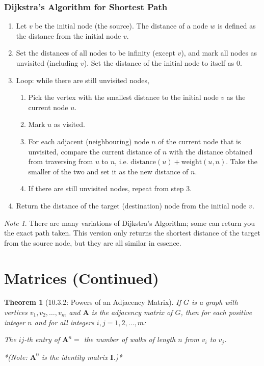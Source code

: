 \documentclass{article}
\theoremstyle{plain}
\newtheorem{theorem}{Theorem}[section]
\theoremstyle{definition}
\theoremstyle{remark}
\newtheorem*{note}{Note}
\begin{document}
\subsubsection*{Dijkstra's Algorithm for Shortest Path}
\begin{enumerate}[label=\arabic*.]
    \item Let $v$ be the initial node (the source). The distance of a node $w$ is defined as the distance from the initial node $v$.
    \item Set the distances of all nodes to be infinity (except $v$), and mark all nodes as unvisited (including $v$). Set the distance of the initial node to itself as 0.
    \item Loop: while there are still unvisited nodes,
    \begin{enumerate}[label=(\alph*)]
        \item Pick the vertex with the smallest distance to the initial node $v$ as the current node $u$.
        \item Mark $u$ as visited.
        \item For each adjacent (neighbouring) node $n$ of the current node that is unvisited, compare the current distance of $n$ with the distance obtained from traversing from $u$ to $n$, i.e. $\text{distance}(u) + \text{weight}(u,n)$. Take the smaller of the two and set it as the new distance of $n$.
        \item If there are still unvisited nodes, repeat from step 3.
    \end{enumerate}
    \item Return the distance of the target (destination) node from the initial node $v$.
\end{enumerate}
\begin{note}
    There are many variations of Dijkstra's Algorithm; some can return you the exact path taken. This version only returns the shortest distance of the target from the source node, but they are all similar in essence.
\end{note}

\section{Matrices (Continued)}

\begin{theorem}[10.3.2: Powers of an Adjacency Matrix]
    If $G$ is a graph with vertices $v_1, v_2, \dots, v_m$ and $\mathbf{A}$ is the adjacency matrix of $G$, then for each positive integer $n$ and for all integers $i, j = 1, 2, \dots, m$:
    \begin{center}
        The $ij$-th entry of $\mathbf{A}^n =$ the number of walks of length $n$ from $v_i$ to $v_j$.
    \end{center}
    *(Note: $\mathbf{A}^0$ is the identity matrix $\mathbf{I}$.)*
\end{theorem}
\end{document}

